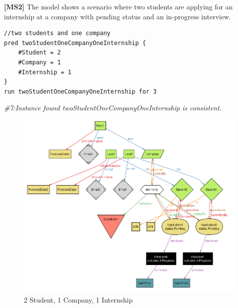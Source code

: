 \pagebreak
\textbf{[MS2]} The model shows a scenario where two students are applying for an internship at a company with pending status and an in-progress interview.
\begin{lstlisting}
//two students and one company
pred twoStudentOneCompanyOneInternship {
    #Student = 2
    #Company = 1
    #Internship = 1
}
run twoStudentOneCompanyOneInternship for 3
\end{lstlisting}
\textit{ \#7:Instance found twoStudentOneCompanyOneInternship is consistent.}
\begin{figure}[H]
    \centering
    \includegraphics[width=1\linewidth]{RASD//Images/2st1com.png}
    \caption{2 Student, 1 Company, 1 Internship}
    \label{fig:enter-label}
\end{figure}

